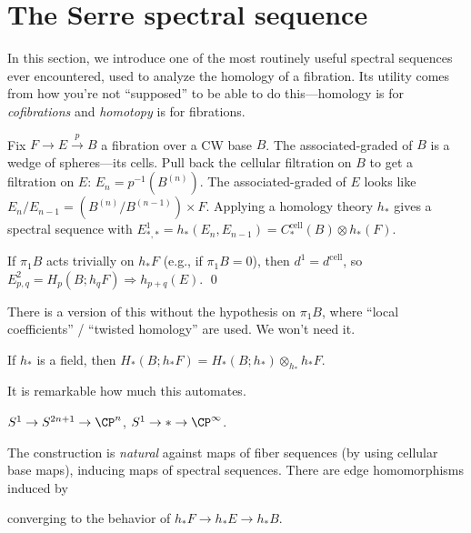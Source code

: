 \section{The Serre spectral sequence}

In this section, we introduce one of the most routinely useful spectral sequences ever encountered, used to analyze the homology of a fibration.  Its utility comes from how you're not ``supposed'' to be able to do this---homology is for \emph{cofibrations} and \emph{homotopy} is for fibrations.

Fix $F \to E \xrightarrow p B$ a fibration over a CW base $B$.  The associated-graded of $B$ is a wedge of spheres---its cells.  Pull back the cellular filtration on $B$ to get a filtration on $E$: $E_n = p^{-1}(B^{(n)})$.  The associated-graded of $E$ looks like $E_n / E_{n-1} = (B^{(n)} / B^{(n-1)}) \times F$.  Applying a homology theory $h_*$ gives a spectral sequence with $E^1_{*, *} = h_*(E_n, E_{n-1}) = C^{\mathrm{cell}}_*(B) \otimes h_*(F)$.

\begin{theorem}[Serre]
If $\pi_1 B$ acts trivially on $h_* F$ (e.g., if $\pi_1 B = 0$), then $d^1 = d^{\mathrm{cell}}$, so $E^2_{p, q} = H_p(B; h_q F) \Rightarrow h_{p+q}(E)$. \qed
\end{theorem}

\begin{remark}
There is a version of this without the hypothesis on $\pi_1 B$, where ``local coefficients'' / ``twisted homology'' are used.  We won't need it.
\end{remark}

\begin{remark}
If $h_*$ is a field, then $H_*(B; h_* F) = H_*(B; h_*) \otimes_{h_*} h_* F$.
\end{remark}

It is remarkable how much this automates.

\begin{example}
$S^1 \to S^{2n+1} \to \CP^n$, $S^1 \to * \to \CP^\infty$.
\end{example}

The construction is \emph{natural} against maps of fiber sequences (by using cellular base maps), inducing maps of spectral sequences.  There are edge homomorphisms induced by
\begin{center}
\end{center}
converging to the behavior of $h_* F \to h_* E \to h_* B$.

